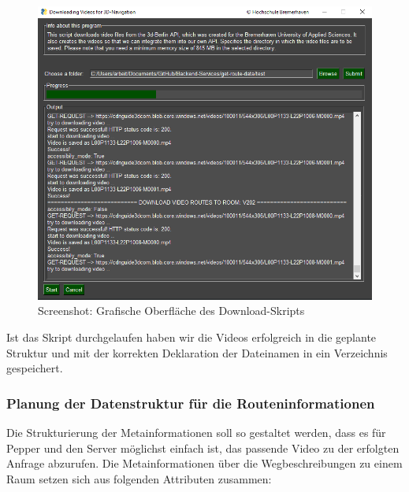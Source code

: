 \begin{figure}[H]
    \includegraphics[width=\textwidth]{Figures/3DNavigator/create_videodata_pic.png}
    \caption{Screenshot: Grafische Oberfläche des Download-Skripts}
    \label{fig:gui-route}
    \centering
\end{figure}\vspace{-2.5mm}

Ist das Skript durchgelaufen haben wir die Videos erfolgreich in die geplante Struktur und mit der korrekten Deklaration der Dateinamen in ein Verzeichnis gespeichert.\\

\subsubsection{Planung der Datenstruktur für die Routeninformationen}

Die Strukturierung der Metainformationen soll so gestaltet werden, dass es für Pepper und den Server möglichst einfach ist, das passende Video zu der erfolgten Anfrage abzurufen. Die Metainformationen über die Wegbeschreibungen zu einem Raum setzen sich aus folgenden Attributen zusammen:\vspace{5mm}

